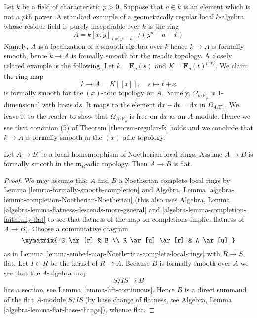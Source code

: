 \begin{example}
\label{example-fs}
Let $k$ be a field of characteristic $p > 0$. Suppose that $a \in k$
is an element which is not a $p$th power. A standard example of a
geometrically regular local $k$-algebra whose residue field is
purely inseparable over $k$ is the ring
$$
A = k[x, y]_{(x, y^p - a)}/(y^p - a - x)
$$
Namely, $A$ is a localization of a smooth algebra over $k$ hence $k \to A$
is formally smooth, hence $k \to A$ is formally smooth for the
$\mathfrak m$-adic topology. A closely related example
is the following. Let $k = \mathbf{F}_p(s)$ and $K = \mathbf{F}_p(t)^{perf}$.
We claim the ring map
$$
k \longrightarrow A = K[[x]],\quad s \longmapsto t + x
$$
is formally smooth for the $(x)$-adic topology on $A$. Namely,
$\Omega_{k/\mathbf{F}_p}$ is $1$-dimensional with basis $\text{d}s$.
It maps to the element
$\text{d}x + \text{d}t = \text{d}x$ in $\Omega_{A/\mathbf{F}_p}$.
We leave it to the reader to show that $\Omega_{A/\mathbf{F}_p}$ is
free on $\text{d}x$ as an $A$-module. Hence we see that condition (5)
of Theorem \ref{theorem-regular-fs} holds and we conclude that $k \to A$
is formally smooth in the $(x)$-adic topology.
\end{example}

\begin{lemma}
\label{lemma-formally-smooth-flat}
Let $A \to B$ be a local homomorphism of Noetherian local rings.
Assume $A \to B$ is formally smooth in the $\mathfrak m_B$-adic
topology. Then $A \to B$ is flat.
\end{lemma}

\begin{proof}
We may assume that $A$ and $B$ a Noetherian complete local rings
by Lemma \ref{lemma-formally-smooth-completion} and
Algebra, Lemma \ref{algebra-lemma-completion-Noetherian-Noetherian}
(this also uses
Algebra, Lemma \ref{algebra-lemma-flatness-descends-more-general} and
\ref{algebra-lemma-completion-faithfully-flat}
to see that flatness of the map on completions implies flatness of
$A \to B$).
Choose a commutative diagram
$$
\xymatrix{
S \ar[r] & B \\
R \ar[u] \ar[r] & A \ar[u]
}
$$
as in Lemma \ref{lemma-embed-map-Noetherian-complete-local-rings}
with $R \to S$ flat. Let $I \subset R$ be the kernel of $R \to A$.
Because $B$ is formally smooth over $A$ we see that the $A$-algebra map
$$
S/IS \longrightarrow B
$$
has a section, see Lemma \ref{lemma-lift-continuous}.
Hence $B$ is a direct summand of the flat $A$-module $S/IS$
(by base change of flatness, see
Algebra, Lemma \ref{algebra-lemma-flat-base-change}),
whence flat.
\end{proof}


